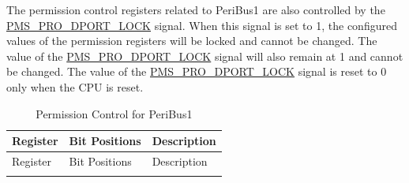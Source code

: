 \documentclass[main\_\_EN.tex]{subfiles}
\begin{document}
The permission control registers related to PeriBus1 are also controlled by the \hyperref[fielddesc:PMSPRODPORTLOCK]{PMS\_PRO\_DPORT\_LOCK} signal. When this signal is set to 1, the configured values of the permission registers will be locked and cannot be changed. The value of the \hyperref[fielddesc:PMSPRODPORTLOCK]{PMS\_PRO\_DPORT\_LOCK} signal will also remain at 1 and cannot be changed. The value of the \hyperref[fielddesc:PMSPRODPORTLOCK]{PMS\_PRO\_DPORT\_LOCK} signal is reset to 0 only when the CPU is reset.

\begin{longtable}[h]{|p{4.5cm}|p{2cm}|p{9.5cm}|}
    \caption{Permission Control for PeriBus1}
    \label{table:PeriBus1_Permission Control_for_RTCSlow}
    \\\hline
    \rowcolor{lightgray}
    Register & Bit Positions & Description \\
    \hline
    \endfirsthead

    \hline
    \rowcolor{lightgray}
    Register & Bit Positions & Description \\
    \hline
    \endhead

    \endfoot

    \hline
    \endlastfoot


\end{longtable}
\end{document}

